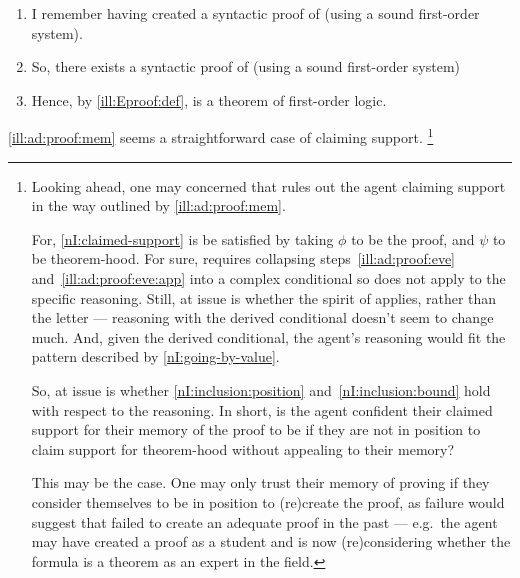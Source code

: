 \begin{note}[Memory]
  \begin{illustration}\label{ill:ad:proof:mem}
    \mbox{}
    \vspace{-\baselineskip}
    \begin{enumerate}
    \item\label{ill:Eproof:mem} I remember having created a syntactic proof of  (using a sound first-order system).
    \item\label{ill:Eproof:exP} So, there exists a syntactic proof of  (using a sound first-order system)
    \item\label{ill:Eproof:thm} Hence, by \ref{ill:Eproof:def},  is a theorem of first-order logic.
    \end{enumerate}
    \vspace{-\baselineskip}
  \end{illustration}

  \autoref{ill:ad:proof:mem} seems a straightforward case of claiming support.\nolinebreak
    \footnote{
      Looking ahead, one may concerned that \nI{} rules out the agent claiming support in the way outlined by \ref{ill:ad:proof:mem}.

      For, \ref{nI:claimed-support} is be satisfied by taking \(\phi\) to be the proof, and \(\psi\) to be theorem-hood.
      For sure, requires collapsing steps~\ref{ill:ad:proof:eve} and~\ref{ill:ad:proof:eve:app} into a complex conditional so \nI{} does not apply to the specific reasoning.
      Still, at issue is whether the spirit of \nI{} applies, rather than the letter --- reasoning with the derived conditional doesn't seem to change much.
      And, given the derived conditional, the agent's reasoning would fit the pattern described by \ref{nI:going-by-value}.

      So, at issue is whether \ref{nI:inclusion:position} and~\ref{nI:inclusion:bound} hold with respect to the reasoning.
      In short, is the agent confident their claimed support for their memory of the proof to be \mom{} if they are not in position to claim support for theorem-hood without appealing to their memory?

      This may be the case.
      One may only trust their memory of proving if they consider themselves to be in position to (re)create the proof, as failure would suggest that failed to create an adequate proof in the past --- e.g.\ the agent may have created a proof as a student and is now (re)considering whether the formula is a theorem as an expert in the field.

}
\end{note}
